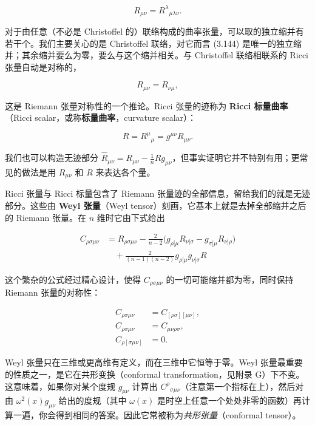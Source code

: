 \begin{equation*}
R_{\mu\nu} = R^\lambda{}_{\mu\lambda\nu}. \tag{3.144}
\end{equation*}

对于由任意（不必是 Christoffel 的）联络构成的曲率张量，可以取的独立缩并有若干个。我们主要关心的是 Christoffel 联络，对它而言 (3.144) 是唯一的独立缩并；其余缩并要么为零，要么与这个缩并相关。与 Christoffel 联络相联系的 Ricci 张量自动是对称的，

\begin{equation*}
R_{\mu\nu} = R_{\nu\mu}, \tag{3.145}
\end{equation*}

这是 Riemann 张量对称性的一个推论。Ricci 张量的迹称为 \textbf{Ricci 标量曲率}（Ricci scalar，或称\textbf{标量曲率}，curvature scalar）：

\begin{equation*}
R = R^\mu{}_\mu = g^{\mu\nu}R_{\mu\nu}. \tag{3.146}
\end{equation*}

我们也可以构造无迹部分 $\widehat R_{\mu\nu} = R_{\mu\nu} - \frac{1}{n}Rg_{\mu\nu}$，但事实证明它并不特别有用；更常见的做法是用 $R_{\mu\nu}$ 和 $R$ 来表达各个量。

Ricci 张量与 Ricci 标量包含了 Riemann 张量迹的全部信息，留给我们的就是无迹部分。这些由 \textbf{Weyl 张量}（Weyl tensor）刻画，它基本上就是去掉全部缩并之后的 Riemann 张量。在 $n$ 维时它由下式给出

\begin{align*}
C_{\rho\sigma\mu\nu} &= R_{\rho\sigma\mu\nu} - \frac{2}{n-2}\big(g_{\rho[\mu}R_{\nu]\sigma} - g_{\sigma[\mu}R_{\nu]\rho}\big)\\
&\quad + \frac{2}{(n-1)(n-2)}g_{\rho[\mu}g_{\nu]\sigma}R \tag{3.147}
\end{align*}

这个繁杂的公式经过精心设计，使得 $C_{\rho\sigma\mu\nu}$ 的一切可能缩并都为零，同时保持 Riemann 张量的对称性：

\begin{align*}
C_{\rho\sigma\mu\nu} &= C_{[\rho\sigma][\mu\nu]},\\
C_{\rho\sigma\mu\nu} &= C_{\mu\nu\rho\sigma},\\
C_{\rho[\sigma\mu\nu]} &= 0. \tag{3.148}
\end{align*}

Weyl 张量只在三维或更高维有定义，而在三维中它恒等于零。Weyl 张量最重要的性质之一，是它在共形变换（conformal transformation，见附录 G）下不变。这意味着，如果你对某个度规 $g_{\mu\nu}$ 计算出 $C^\rho{}_{\sigma\mu\nu}$（注意第一个指标在上），然后对由 $\omega^2(x)g_{\mu\nu}$ 给出的度规（其中 $\omega(x)$ 是时空上任意一个处处非零的函数）再计算一遍，你会得到相同的答案。因此它常被称为\emph{共形张量}（conformal tensor）。

